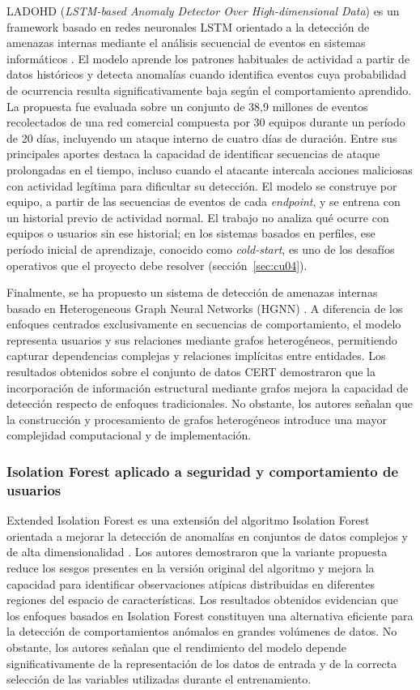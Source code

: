 LADOHD (\emph{LSTM-based Anomaly Detector Over High-dimensional Data}) es un framework basado en redes neuronales LSTM orientado a la detección de amenazas internas mediante el análisis secuencial de eventos en sistemas informáticos \parencite{VillarrealVasquez2021}. El modelo aprende los patrones habituales de actividad a partir de datos históricos y detecta anomalías cuando identifica eventos cuya probabilidad de ocurrencia resulta significativamente baja según el comportamiento aprendido. La propuesta fue evaluada sobre un conjunto de 38,9 millones de eventos recolectados de una red comercial compuesta por 30 equipos durante un período de 20 días, incluyendo un ataque interno de cuatro días de duración. Entre sus principales aportes destaca la capacidad de identificar secuencias de ataque prolongadas en el tiempo, incluso cuando el atacante intercala acciones maliciosas con actividad legítima para dificultar su detección. El modelo se construye por equipo, a partir de las secuencias de eventos de cada \emph{endpoint}, y se entrena con un historial previo de actividad normal. El trabajo no analiza qué ocurre con equipos o usuarios sin ese historial; en los sistemas basados en perfiles, ese período inicial de aprendizaje, conocido como \emph{cold-start}, es uno de los desafíos operativos que el proyecto debe resolver (sección~\ref{sec:cu04}).

Finalmente, se ha propuesto un sistema de detección de amenazas internas basado en Heterogeneous Graph Neural Networks (HGNN) \parencite{Tian2023HGNN}. A diferencia de los enfoques centrados exclusivamente en secuencias de comportamiento, el modelo representa usuarios y sus relaciones mediante grafos heterogéneos, permitiendo capturar dependencias complejas y relaciones implícitas entre entidades. Los resultados obtenidos sobre el conjunto de datos CERT demostraron que la incorporación de información estructural mediante grafos mejora la capacidad de detección respecto de enfoques tradicionales. No obstante, los autores señalan que la construcción y procesamiento de grafos heterogéneos introduce una mayor complejidad computacional y de implementación.

\subsubsection{Isolation Forest aplicado a seguridad y comportamiento de usuarios}\label{sec:ea-if}
Extended Isolation Forest es una extensión del algoritmo Isolation Forest orientada a mejorar la detección de anomalías en conjuntos de datos complejos y de alta dimensionalidad \parencite{Hariri2019}. Los autores demostraron que la variante propuesta reduce los sesgos presentes en la versión original del algoritmo y mejora la capacidad para identificar observaciones atípicas distribuidas en diferentes regiones del espacio de características. Los resultados obtenidos evidencian que los enfoques basados en Isolation Forest constituyen una alternativa eficiente para la detección de comportamientos anómalos en grandes volúmenes de datos. No obstante, los autores señalan que el rendimiento del modelo depende significativamente de la representación de los datos de entrada y de la correcta selección de las variables utilizadas durante el entrenamiento.

